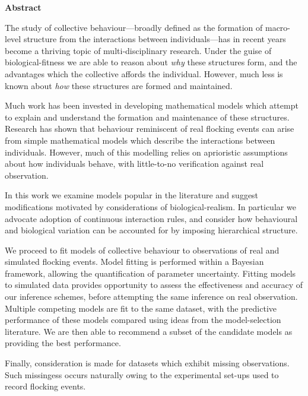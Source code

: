 \thispagestyle{empty}

\clearpage
\vspace*{\fill}

\begin{center}
  \textbf{Abstract}\\[0.75cm]

  \begin{minipage}{0.8\textwidth}
    The study of collective behaviour---broadly defined as the formation of
    macro-level structure from the interactions between individuals---has in
    recent years become a thriving topic of multi-disciplinary research. Under
    the guise of biological-fitness we are able to reason about \emph{why}
    these structures form, and the advantages which the collective affords the
    individual. However, much less is known about \emph{how} these structures
    are formed and maintained.

    Much work has been invested in developing mathematical models which attempt
    to explain and understand the formation and maintenance of these
    structures. Research has shown that behaviour reminiscent of real flocking
    events can arise from simple mathematical models which describe the
    interactions between individuals. However, much of this modelling relies
    on aprioristic assumptions about how individuals behave, with little-to-no 
    verification against real observation.

    In this work we examine models popular in the literature and suggest
    modifications motivated by considerations of biological-realism. In
    particular we advocate adoption of continuous interaction rules, and
    consider how behavioural and biological variation can be accounted for by
    imposing hierarchical structure.

    We proceed to fit models of collective behaviour to observations of real
    and simulated flocking events. Model fitting is performed within a Bayesian
    framework, allowing the quantification of parameter uncertainty. Fitting
    models to simulated data provides opportunity to assess the effectiveness
    and accuracy of our inference schemes, before attempting the same inference
    on real observation. Multiple competing models are fit to the same dataset,
    with the predictive performance of these models compared using ideas from
    the model-selection literature. We are then able to recommend a subset of
    the candidate models as providing the best performance.

    Finally, consideration is made for datasets which exhibit missing
    observations. Such missingess occurs naturally owing to the experimental
    set-ups used to record flocking events.
  \end{minipage}

\end{center}

\vfill
\cleardoublepage
